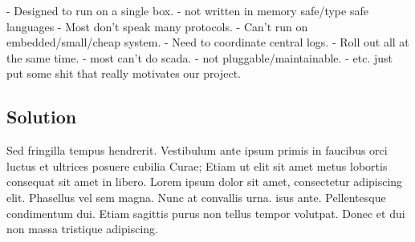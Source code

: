 - Designed to run on a single box.
- not written in memory safe/type safe languages
- Most don't speak many protocols.
- Can't run on embedded/small/cheap system.
- Need to coordinate central logs.
- Roll out all at the same time.
- most can't do scada.
- not pluggable/maintainable.
- etc. just put some shit that really motivates our project.

\subsection*{Solution}

Sed fringilla tempus hendrerit. Vestibulum ante ipsum primis in faucibus orci
luctus et ultrices posuere cubilia Curae; Etiam ut elit sit amet metus lobortis
consequat sit amet in libero. Lorem ipsum dolor sit amet, consectetur
adipiscing elit. Phasellus vel sem magna. Nunc at convallis urna. isus ante.
Pellentesque condimentum dui. Etiam sagittis purus non tellus tempor volutpat. 
Donec et dui non massa tristique adipiscing.

\iffalse

\begin{itemize}
\item\Large{\color{Blue}\textbf{Background Information}}
	\begin{itemize}
	\centering\large{SCADA (Supervisory Control and Data Acquisition) systems play a vital role in the infrastructure of modern day society, controlling a multitude of systems/services such as:}
		\begin{itemize}
		\setlength{\columnsep}{-5cm}
		\def\columnseprulecolor{\color{white}}
		\begin{centering}
		\begin{multicols}{2}
		\raggedright\item\large{Water Treatment Plants}
		\raggedright\item\large{Oil Pipelines}
		\raggedright\item\large{HVAC Systems}
		\raggedright\item\large{Elctrical Substations}
		\end{multicols}
		\end{centering}
		\end{itemize}
	\large{Unfortunately, these systems often run on dated, customized technology which can be prone to malicious network attack.}
	\end{itemize}
\item\Large{\color{Blue}\textbf{The Problem}}
	\begin{itemize}
	\item\large{TODO: Our Problem Statement. Maybe: Design and build a Low-Interaction honeypot device which monitor network traffic and look for security related deviations.}
	\end{itemize}
\item\Large{\color{Blue}\textbf{The Solution}}
	\begin{itemize}
	\item\large{Create a low cost, stand-alone, configurable security device which can be easily deployed in a wide range of SCADA environments.}
	\end{itemize}
\end{itemize}

\fi

